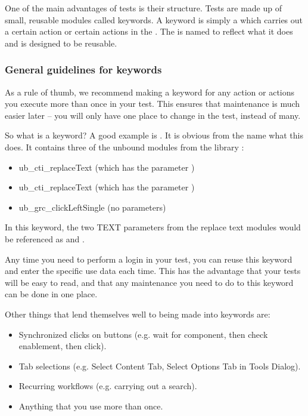 One of the main advantages of \app{} tests is their structure. Tests are made up of small, reusable modules called keywords. A keyword is simply a \gdcase{} which carries out a certain action or certain actions in the \gdaut{}. The \gdcase{} is named to reflect what it does and is designed to be reusable. 

\subsubsection{General guidelines for keywords}
\label{BPKeywordsGeneral}
As a rule of thumb, we recommend making a keyword for any action or actions you execute more than once in your test. This ensures that maintenance is much easier later -- you will only have one place to change in the test, instead of many.  

So what is a keyword? A good example is . It is obvious from the name what this \gdcase{} does. It contains three of the \app{} unbound modules from the library \gdproject{}:\\
\begin{itemize}
\item ub\_cti\_replaceText (which has the parameter )
\item ub\_cti\_replaceText (which has the parameter )
\item ub\_grc\_clickLeftSingle (no parameters)
\end{itemize}

In this keyword, the two TEXT parameters from the replace text modules would be referenced as  and  .

Any time you need to perform a login in your test, you can reuse this keyword and enter the specific use data each time. This has the advantage that your tests will be easy to read, and that any maintenance you need to do to this keyword can be done in one place. 

Other things that lend themselves well to being made into keywords are:
\begin{itemize}
\item Synchronized clicks on buttons (e.g. wait for component, then check enablement, then click). 
\item Tab selections (e.g. Select Content Tab, Select Options Tab in Tools Dialog). 
\item Recurring workflows (e.g. carrying out a search).
\item Anything that you use more than once.
\end{itemize}

